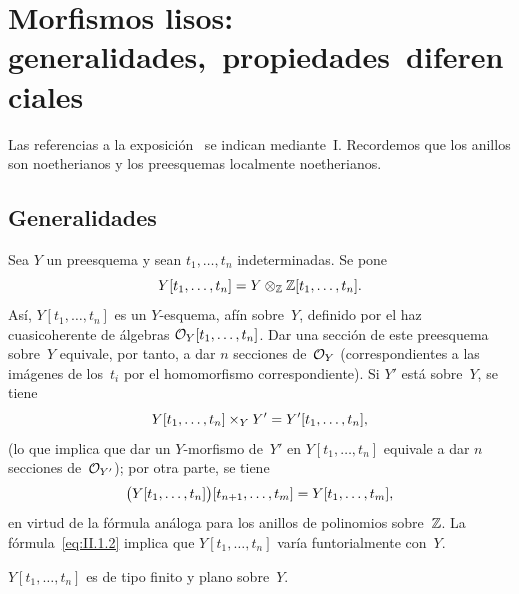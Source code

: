 \chapter{Morfismos lisos: generalidades,~propiedades~diferenciales}
\label{II}

Las referencias a la exposición~ se indican mediante~I. Recordemos que los anillos son noetherianos y los preesquemas localmente noetherianos.

\section{Generalidades}
\label{II.1}

Sea $Y$ un preesquema y sean $t_1,\dots,t_n$ indeterminadas. Se pone
\begin{equation}
\label{eq:II.1.1}
Y[t_1,\dots,t_n]=Y\otimes_\ZZ\ZZ[t_1,\dots,t_n]\quoi.
\end{equation}
Así, $Y[t_1,\dots,t_n]$ es un $Y$-esquema, afín sobre~$Y$, definido por el haz cuasicoherente de álgebras $\cal{O}_Y[t_1,\dots,t_n]$. Dar una sección de este preesquema sobre~$Y$ equivale, por tanto, a dar $n$ secciones de~$\cal{O}_Y$ (correspondientes a las imágenes de los~$t_i$ por el homomorfismo correspondiente). Si $Y'$ está sobre~$Y$, se tiene
\begin{equation}
\label{eq:II.1.2}
Y[t_1,\dots,t_n]\times_YY'=Y'[t_1,\dots,t_n]\quoi,
\end{equation}
(lo que implica que dar un $Y$-morfismo de~$Y'$ en $Y[t_1,\dots,t_n]$ equivale a dar $n$ secciones de~$\cal{O}_{Y'}$); por otra parte, se tiene
\begin{equation}
\label{eq:II.1.3}
\bigl(Y[t_1,\dots,t_n]\bigr)[t_{n+1},\dots,t_m]=Y[t_1,\dots,t_m]\quoi,
\end{equation}
en virtud de la fórmula análoga para los anillos de polinomios sobre~$\ZZ$. La fórmula~\eqref{eq:II.1.2} implica que $Y[t_1,\dots,t_n]$ varía funtorialmente con~$Y$.

$Y[t_1,\dots,t_n]$ es de tipo finito y plano sobre~$Y$.

